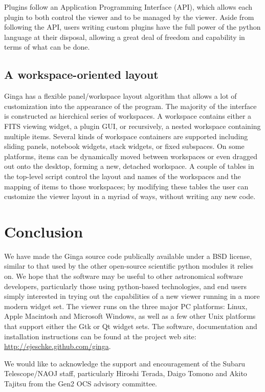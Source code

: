 Plugins follow an Application Programming Interface (API), which allows
each plugin to both control the viewer and to be managed by the viewer.
Aside from following the API, users writing custom plugins have the full
power of the python language at their disposal, allowing a great deal of
freedom and capability in terms of what can be done.   

\subsection{A workspace-oriented layout}
Ginga has a flexible panel/workspace layout algorithm that allows a
lot of customization into the appearance of the program.  The majority
of the interface is constructed as hierchical series of workspaces.
A workspace contains either a FITS viewing widget, a plugin GUI, or
recursively, a nested workspace containing multiple items.
Several kinds of workspace containers are supported including sliding
panels, notebook widgets, stack widgets, or fixed subspaces. 
On some platforms, items can be dynamically moved between workspaces or
even dragged out onto the desktop, forming a new, detached workspace.
A couple of tables in the top-level script control the layout and names of
the workspaces and the mapping of items to those workspaces;
by modifying these tables the user can customize the viewer layout in a
myriad of ways, without writing any new code. 

\section{Conclusion}
We have made the Ginga source code publically available under a BSD
license, similar to that used by the other open-source scientific python
modules it relies on. 
We hope that the software may be useful to other astronomical software
developers, particularly those using python-based technologies, and end
users simply interested in trying out the capabilities of a new viewer
running in a more modern widget set.  The viewer runs on the three major
PC platforms: Linux, Apple Macintosh and Microsoft Windows, as well as a
few other Unix platforms that support either the Gtk or Qt widget sets.
The software, documentation and installation instructions can be found
at the project web site: \url{http://ejeschke.github.com/ginga}.

\acknowledgements We would like to acknowledge the support and
encouragement of the Subaru Telescope/NAOJ staff, particularly Hiroshi
Terada, Daigo Tomono and Akito Tajitsu from the Gen2 OCS advisory
committee. 


